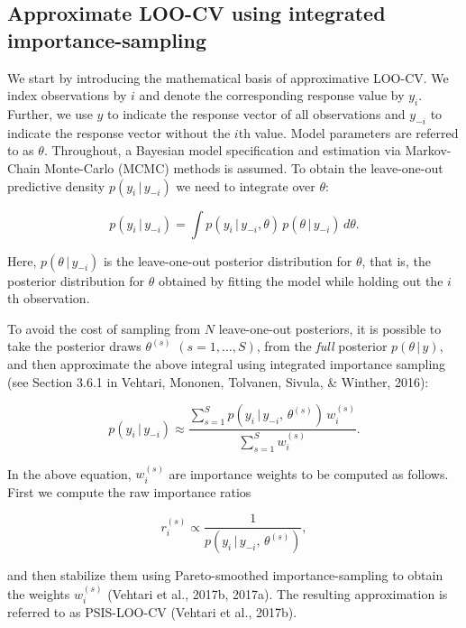 \documentclass[english,,doc,floatsintext]{apa6}
\theoremstyle{definition}
\theoremstyle{definition}
\theoremstyle{definition}
\theoremstyle{remark}
\begin{document}
\hypertarget{approximate-loo-cv-using-integrated-importance-sampling}{%
\subsection{Approximate LOO-CV using integrated
importance-sampling}\label{approximate-loo-cv-using-integrated-importance-sampling}}

We start by introducing the mathematical basis of approximative LOO-CV.
We index observations by \(i\) and denote the corresponding response
value by \(y_i\). Further, we use \(y\) to indicate the response vector
of all observations and \(y_{-i}\) to indicate the response vector
without the \(i\)th value. Model parameters are referred to as
\(\theta\). Throughout, a Bayesian model specification and estimation
via Markov-Chain Monte-Carlo (MCMC) methods is assumed. To obtain the
leave-one-out predictive density \(p(y_i \,|\, y_{-i})\) we need to
integrate over \(\theta\):

\begin{equation}
p(y_i\,|\,y_{-i}) =
  \int p(y_i\,|\, y_{-i}, \theta) \, p(\theta\,|\, y_{-i}) \,d \theta.
\end{equation}

Here, \(p(\theta\,|\, y_{-i})\) is the leave-one-out posterior
distribution for \(\theta\), that is, the posterior distribution for
\(\theta\) obtained by fitting the model while holding out the \(i\)th
observation.

To avoid the cost of sampling from \(N\) leave-one-out posteriors, it is
possible to take the posterior draws \(\theta^{(s)}\)
\((s=1,\ldots,S)\), from the \emph{full} posterior \(p(\theta\,|\, y)\),
and then approximate the above integral using integrated importance
sampling (see Section 3.6.1 in Vehtari, Mononen, Tolvanen, Sivula, \&
Winther, 2016):

\begin{equation}
 p(y_i\,|\, y_{-i}) \approx
   \frac{ \sum_{s=1}^S p(y_i\,|\,y_{-i},\,\theta^{(s)}) \,w_i^{(s)}}{ \sum_{s=1}^S w_i^{(s)}}.
\end{equation}

In the above equation, \(w_i^{(s)}\) are importance weights to be
computed as follows. First we compute the raw importance ratios

\begin{equation}
  r_i^{(s)} \propto \frac{1}{p(y_i \,|\, y_{-i}, \, \theta^{(s)})},
\end{equation}

and then stabilize them using Pareto-smoothed importance-sampling to
obtain the weights \(w_i^{(s)}\) (Vehtari et al., 2017b, 2017a). The
resulting approximation is referred to as PSIS-LOO-CV (Vehtari et al.,
2017b).
\end{document}
